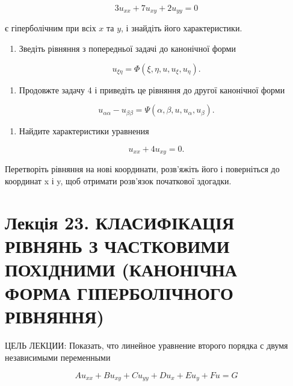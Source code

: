 \documentclass[
  ukrainian,
]{article}
\providecommand{\tightlist}{%
  \setlength{\itemsep}{0pt}\setlength{\parskip}{0pt}}
\begin{document}
\[
3u_{xx} + 7u_{xy} + 2u_{yy} = 0
\]

є гіперболічним при всіх \(x\) та \(y\), і знайдіть його характеристики.

\begin{enumerate}
\def\labelenumi{\arabic{enumi}.}
\setcounter{enumi}{3}
\tightlist
\item
  Зведіть рівняння з попередньої задачі до канонічної форми
\end{enumerate}

\[
u_{\xi\eta} = \Phi(\xi, \eta, u, u_{\xi}, u_{\eta}).
\]

\begin{enumerate}
\def\labelenumi{\arabic{enumi}.}
\setcounter{enumi}{4}
\tightlist
\item
  Продовжте задачу 4 і приведіть це рівняння до другої канонічної форми
\end{enumerate}

\[
u_{\alpha\alpha} - u_{\beta\beta} = \Psi(\alpha, \beta, u, u_{\alpha}, u_{\beta}).
\]

\begin{enumerate}
\def\labelenumi{\arabic{enumi}.}
\setcounter{enumi}{5}
\tightlist
\item
  Найдите характеристики уравнения
\end{enumerate}

\[
u_{xx} + 4u_{xy} = 0.
\]

Перетворіть рівняння на нові координати, розв'яжіть його і поверніться
до координат x і y, щоб отримати розв'язок початкової здогадки.

\section{Лекція 23. КЛАСИФІКАЦІЯ РІВНЯНЬ З ЧАСТКОВИМИ ПОХІДНИМИ
(КАНОНІЧНА ФОРМА ГІПЕРБОЛІЧНОГО
РІВНЯННЯ)}\label{ux43bux435ux43aux446ux456ux44f-23.-ux43aux43bux430ux441ux438ux444ux456ux43aux430ux446ux456ux44f-ux440ux456ux432ux43dux44fux43dux44c-ux437-ux447ux430ux441ux442ux43aux43eux432ux438ux43cux438-ux43fux43eux445ux456ux434ux43dux438ux43cux438-ux43aux430ux43dux43eux43dux456ux447ux43dux430-ux444ux43eux440ux43cux430-ux433ux456ux43fux435ux440ux431ux43eux43bux456ux447ux43dux43eux433ux43e-ux440ux456ux432ux43dux44fux43dux43dux44f}

ЦЕЛЬ ЛЕКЦИИ: Показать, что линейное уравнение второго порядка с двумя
независимыми переменными

\[
Au_{xx} + Bu_{xy} + Cu_{yy} + Du_x + Eu_y + Fu = G
\]
\end{document}
